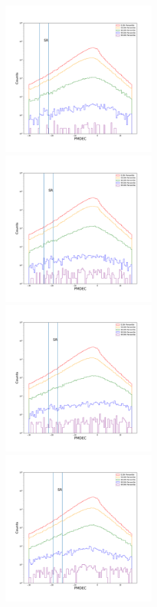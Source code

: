 \documentclass[12pt,prd]{article}
\begin{document}
\begin{figure}[h!]
\centering
\includegraphics[width=0.5\textwidth]{../figures/scanning_plotsgaiascan_l101_2_b58_4_ra212_7_dec55_2_npy_0.pdf}
\includegraphics[width=0.5\textwidth]{../figures/scanning_plotsgaiascan_l101_2_b58_4_ra212_7_dec55_2_npy_1.pdf}
\includegraphics[width=0.5\textwidth]{../figures/scanning_plotsgaiascan_l101_2_b58_4_ra212_7_dec55_2_npy_2.pdf}
\includegraphics[width=0.5\textwidth]{../figures/scanning_plotsgaiascan_l101_2_b58_4_ra212_7_dec55_2_npy_3.pdf}

\end{figure}
\end{document}
